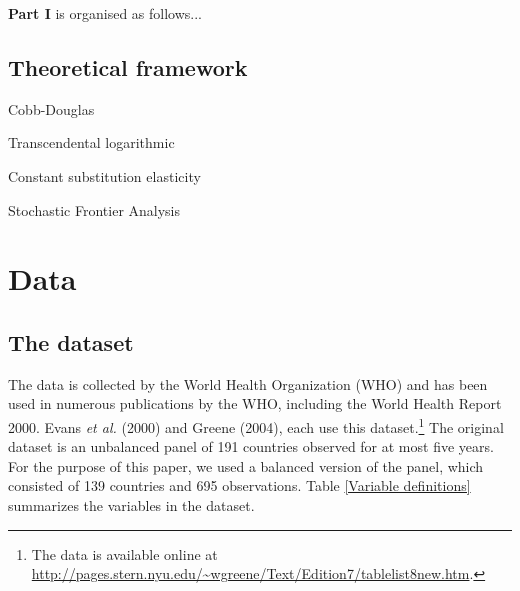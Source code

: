 \documentclass[12pt,a4paper]{article}\usepackage[]{graphicx}\usepackage[]{color}
\begin{document}
\textbf{Part I} is organised as follows...


\subsection{Theoretical framework}
Cobb-Douglas

Transcendental logarithmic 

Constant substitution elasticity

Stochastic Frontier Analysis


% 
\section{Data}




\subsection{The dataset}
The data is collected by the World Health Organization (WHO) and has been used in numerous publications by the WHO, including the World Health Report 2000. Evans \textit{et al.} (2000) and Greene (2004), each use this dataset.\footnote{The data is available online at \\ \url{http://pages.stern.nyu.edu/~wgreene/Text/Edition7/tablelist8new.htm}.} The original dataset is an unbalanced panel of 191 countries observed for at most five years. For the purpose of this paper, we used a balanced version of the panel, which consisted of 139 countries and 695 observations. Table \ref{Variable definitions} summarizes the variables in the dataset.
\end{document}
